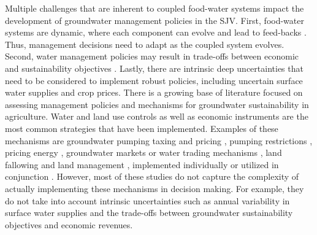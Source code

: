 \documentclass[a4paper,fleqn]{cas-sc}
\begin{document}
Multiple challenges that are inherent to coupled food-water systems \citep{polhill_modelling_2016} impact the development of groundwater management policies in the SJV. First, food-water systems are dynamic, where each component can evolve and lead to feed-backs \citep{filatova_regime_2016}. Thus, management decisions need to adapt as the coupled system evolves. Second, water management policies may result in trade-offs between economic and sustainability objectives \citep{mcdermid_minimizing_2021,stone_economic_2022,torhan_tradeoffs_2022,null_pareto_2021}. Lastly, there are intrinsic deep uncertainties \citep{stirling_keep_2010} that need to be considered to implement robust policies, including uncertain surface water supplies and crop prices. There is a growing base of literature focused on assessing management policies and mechanisms for groundwater sustainability in agriculture. Water and land use controls as well as economic instruments are the most common strategies that have been implemented. Examples of these mechanisms are groundwater pumping taxing and pricing  \citep{madani_exogenous_2013,mulligan_assessing_2014,stone_economic_2022,wang_development_2023}, pumping restrictions \citep{young_hydrologic-economic_2021,lan_performance_2021,macewan_hydroeconomic_2017,rodriguez-flores_global_2022,wang_development_2023}, pricing energy \citep{hrozencik_impacts_2022}, groundwater markets or water trading mechanisms \citep{khan_effect_2019,kuwayama_regulation_2013,safari_market-based_2023}, land fallowing \citep{van_schmidt_linkages_2022} and land management \citep{bourque_balancing_2019,li_evaluation_2018,bryant_shaping_2020}, implemented individually or utilized in conjunction \citep{graveline_combining_2020,hrozencik_heterogeneous_2017}. However, most of these studies do not capture the complexity of actually implementing these mechanisms in decision making. For example, they do not take into account intrinsic uncertainties such as annual variability in surface water supplies and the trade-offs between groundwater sustainability objectives and economic revenues. 
\end{document}
